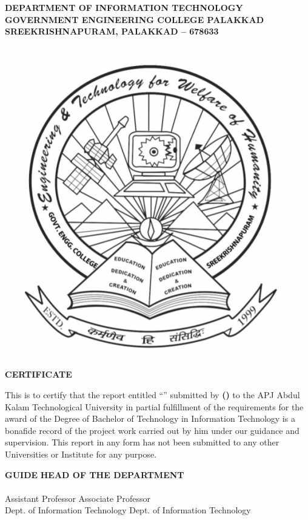 \begin{titlepage}
\vfill
\begin{center}
    \textbf{
    DEPARTMENT OF INFORMATION TECHNOLOGY 
    GOVERNMENT ENGINEERING COLLEGE PALAKKAD 
    SREEKRISHNAPURAM, PALAKKAD – 678633
    }
    
    \vspace{1cm}
    
    \includegraphics[scale=0.3]{covers/images/logoGecp.png}
    
    \vspace{1cm}
    
    \textbf{
        \Large{
            CERTIFICATE
        }
    }
    
\end{center}

This is to certify that the report entitled “\textbf{\cTitle}” submitted by \textbf{\cName (\cRegNo)} to the APJ Abdul Kalam Technological University in partial fulfillment of the requirements for the award of the Degree of Bachelor of Technology in Information Technology is a bonafide record of the project work carried out by him under our guidance and supervision. This report in any form has not been submitted to any other Universities or Institute for any purpose.

\vspace{2cm}

\noindent \textbf{GUIDE} \hfill \textbf{HEAD OF THE DEPARTMENT}\\
\cGuide \hfill \cHod \\
Assistant Professor \hfill Associate Professor\\
Dept. of Information Technology \hfill Dept. of Information Technology

\vfill
\end{titlepage}


